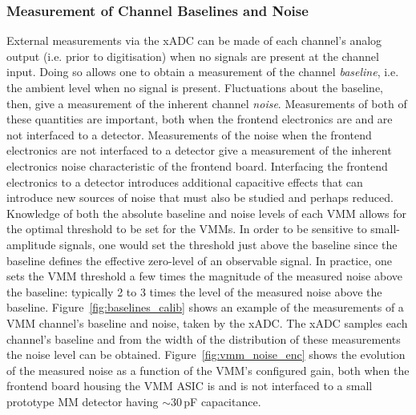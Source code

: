 \subsubsection{Measurement of Channel Baselines and Noise}
\label{sec:calib_baselines}


External measurements via the xADC can be made of each channel's analog output (i.e. prior
to digitisation) when no signals are present at the channel input.
Doing so allows one to obtain a measurement of the channel \textit{baseline}, i.e. the
ambient level when no signal is present.
Fluctuations about the baseline, then, give a measurement of the inherent channel \textit{noise}.
Measurements of both of these quantities are important, both when the frontend electronics
are and are not interfaced to a detector.
Measurements of the noise when the frontend electronics are not interfaced to a detector give
a measurement of the inherent electronics noise characteristic of the frontend board.
Interfacing the frontend electronics to a detector introduces additional capacitive effects
that can introduce new sources of noise that must also be studied and perhaps reduced.
Knowledge of both the absolute baseline and noise levels of each VMM allows for the optimal threshold
to be set for the VMMs.
In order to be sensitive to small-amplitude signals, one would set the threshold just above the baseline
since the baseline defines the effective zero-level of an observable signal.
In practice, one sets the VMM threshold a few times the magnitude of the measured noise above the baseline: typically
2 to 3 times the level of the measured noise above the baseline.
Figure~\ref{fig:baselines_calib} shows an example of the measurements of a VMM channel's baseline and noise, taken by the xADC.
The xADC samples each channel's baseline and from the width of the distribution of these measurements the noise
level can be obtained.
Figure~\ref{fig:vmm_noise_enc} shows the evolution of the measured noise as a function of the VMM's
configured gain, both when the frontend board housing the VMM ASIC is and is not interfaced to a small prototype
MM detector having $\sim$30\,pF capacitance.

